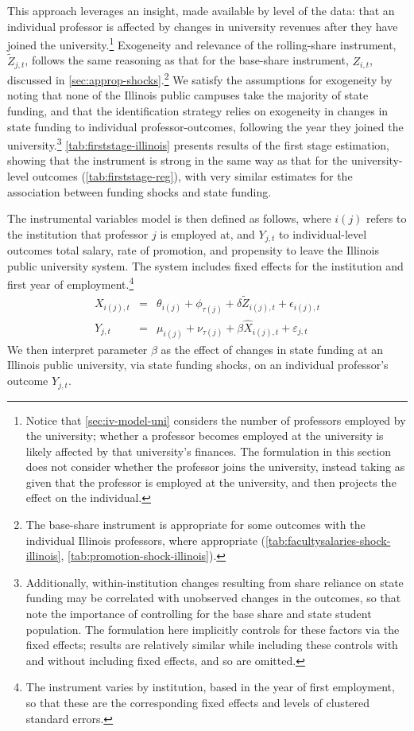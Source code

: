 This approach leverages an insight, made available by level of the data: that an individual professor is affected by changes in university revenues after they have joined the university.\footnote{
    Notice that \autoref{sec:iv-model-uni} considers the number of professors employed by the university; whether a professor becomes employed at the university is likely affected by that university's finances.
    The formulation in this section does not consider whether the professor joins the university, instead taking as given that the professor is employed at the university, and then projects the effect on the individual.
}
Exogeneity and relevance of the rolling-share instrument, $\tilde Z_{j,t}$, follows the same reasoning as that for the base-share instrument, $Z_{i,t}$, discussed in \autoref{sec:approp-shocks}.\footnote{
    The base-share instrument is appropriate for some outcomes with the individual Illinois professors, where appropriate (\autoref{tab:facultysalaries-shock-illinois}, \ref{tab:promotion-shock-illinois}).
}
We satisfy the assumptions for exogeneity by noting that none of the Illinois public campuses take the majority of state funding, and that the identification strategy relies on exogeneity in changes in state funding to individual professor-outcomes, following the year they joined the university.\footnote{
    Additionally, within-institution changes resulting from share reliance on state funding may be correlated with unobserved changes in the outcomes, so that \cite{NBERw27885} note the importance of controlling for the base share and state student population.
    The formulation here implicitly controls for these factors via the fixed effects; results are relatively similar while including these controls with and without including fixed effects, and so are omitted.
}
\autoref{tab:firststage-illinois} presents results of the first stage estimation, showing that the instrument is strong in the same way as that for the university-level outcomes (\autoref{tab:firststage-reg}), with very similar estimates for the association between funding shocks and state funding.

The instrumental variables model is then defined as follows, where $i(j)$ refers to the institution that professor $j$ is employed at, and $Y_{j,t}$ to individual-level outcomes total salary, rate of promotion, and propensity to leave the Illinois public university system.
The system includes fixed effects for the institution and first year of employment.\footnote{
    The instrument varies by institution, based in the year of first employment, so that these are the corresponding fixed effects and levels of clustered standard errors.
}
\begin{eqnarray}
    \label{eqn:secondstage1_indiv}
    X_{i(j),t} &=& \theta_{i(j)} + \phi_{\tau(j)} + \delta \tilde Z_{i(j),t} + \epsilon_{i(j),t} \\
    \label{eqn:secondstage2_indiv}
    Y_{j,t} &=& \mu_{i(j)} + \nu_{\tau(j)} + \beta \widehat X_{i(j),t} + \varepsilon_{j,t}
\end{eqnarray}
We then interpret parameter $\beta$ as the effect of changes in state funding at an Illinois public university, via state funding shocks, on an individual professor's outcome $Y_{j,t}$.
